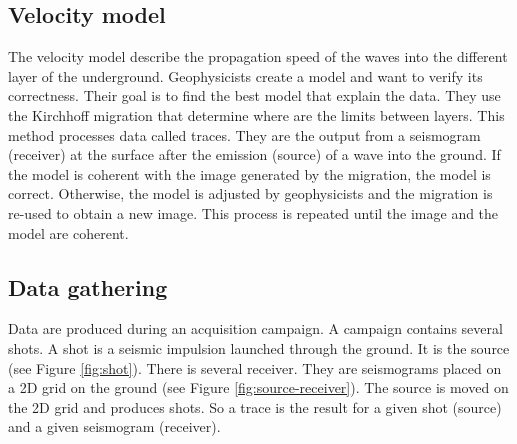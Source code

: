 \subsection{Velocity model}
The velocity model describe the propagation speed of the waves into the different layer of the underground.
Geophysicists create a model and want to verify its correctness.
Their goal is to find the best model that explain the data.
They use the Kirchhoff migration that determine where are the limits between layers.
This method processes data called traces.
They are the output from a seismogram (receiver) at the surface after the emission (source) of a wave into the ground.
If the model is coherent with the image generated by the migration, the model is correct.
Otherwise, the model is adjusted by geophysicists and the migration is re-used to obtain a new image.
This process is repeated until the image and the model are coherent.

\subsection{Data gathering}
Data are produced during an acquisition campaign.
A campaign contains several shots.
A shot is a seismic impulsion launched through the ground.
It is the source (see Figure \ref{fig:shot}).
There is several receiver.
They are seismograms placed on a 2D grid on the ground (see Figure \ref{fig:source-receiver}).
The source is moved on the 2D grid and produces shots.
So a trace is the result for a given shot (source) and a given seismogram (receiver).

